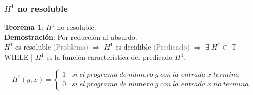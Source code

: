 \documentclass[xcolor=table]{beamer}
\begin{document}
\begin{frame}[fragile]\frametitle{$H^1$ no resoluble} \scriptsize

\textbf{Teorema 1}: $H^1$ no resoluble.\\

\textbf{Demostración}: Por reducción al absurdo.\\

$H^1$ es resoluble \textcolor{gray}{(Problema)} $\Rightarrow$ $H^1$ es decidible \textcolor{gray}{(Predicado)}  $\Rightarrow$ $\exists$ $H^1 \in$ T-WHILE | $H^1$ es la función característica del predicado $H^1$.


\[ H^1 (g, x) = \left\{ \begin{array}{lr} 1 & si\; el\; programa \;de\; n\acute{u}mero \;g \;con\; la\; entrada\; x \;termina\\ 0 & si\; el \;programa\; de\; n\acute{u}mero \;g \;con \;la \;entrada\; x \;no\; termina \end{array} \right. \]


\end{frame}
\end{document}
